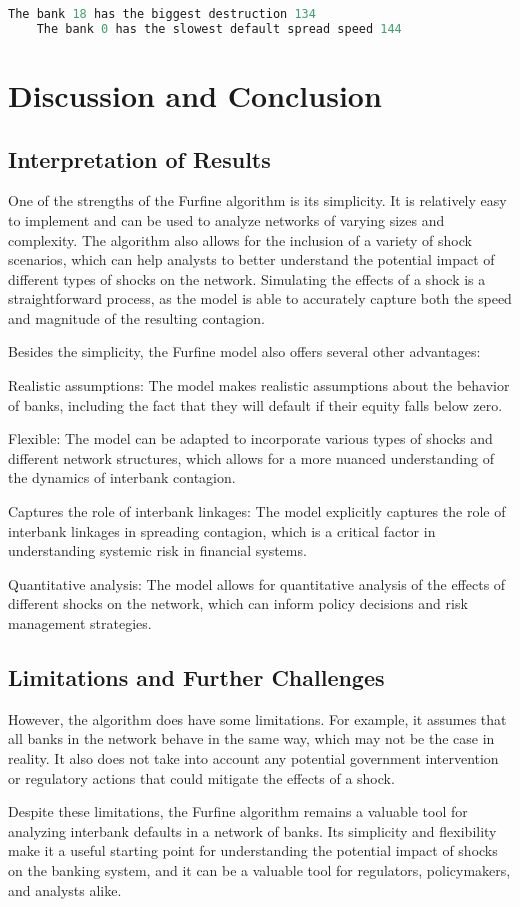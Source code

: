 \begin{lstlisting}[language=python]
    The bank 18 has the biggest destruction 134
    The bank 0 has the slowest default spread speed 144
\end{lstlisting}

\section{Discussion and Conclusion}


\subsection{Interpretation of Results}
One of the strengths of the Furfine algorithm is its simplicity. It is relatively easy to implement and can be used to analyze networks of varying sizes and complexity. The algorithm also allows for the inclusion of a variety of shock scenarios, which can help analysts to better understand the potential impact of different types of shocks on the network. Simulating the effects of a shock is a straightforward process, as the model is able to accurately capture both the speed and magnitude of the resulting contagion.

Besides the simplicity, the Furfine model also offers several other advantages:

Realistic assumptions: The model makes realistic assumptions about the behavior of banks, including the fact that they will default if their equity falls below zero.

Flexible: The model can be adapted to incorporate various types of shocks and different network structures, which allows for a more nuanced understanding of the dynamics of interbank contagion.

Captures the role of interbank linkages: The model explicitly captures the role of interbank linkages in spreading contagion, which is a critical factor in understanding systemic risk in financial systems.

Quantitative analysis: The model allows for quantitative analysis of the effects of different shocks on the network, which can inform policy decisions and risk management strategies.

\subsection{Limitations and Further Challenges}

However, the algorithm does have some limitations. For example, it assumes that all banks in the network behave in the same way, which may not be the case in reality. It also does not take into account any potential government intervention or regulatory actions that could mitigate the effects of a shock.

Despite these limitations, the Furfine algorithm remains a valuable tool for analyzing interbank defaults in a network of banks. Its simplicity and flexibility make it a useful starting point for understanding the potential impact of shocks on the banking system, and it can be a valuable tool for regulators, policymakers, and analysts alike.
